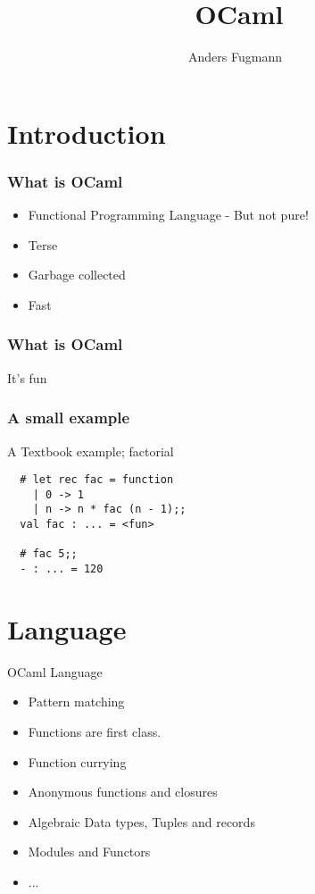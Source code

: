 \documentclass[xcolor=svgnames]{beamer}
\renewcommand{\_}{\mathunderscore}
\begin{document}
\title[Introduction to OCaml]{\
  OCaml
}
\author[Anders Fugmann]{\
  \normalfont Anders Fugmann
}
\date{}

\maketitle

\section{Introduction}

\begin{frame}[fragile]
  \frametitle{What is OCaml}
  \pause
   \begin{itemize}
   \item Functional Programming Language - But not pure!
  \pause
   \item Terse
  \pause
   \item Garbage collected
  \pause
   \item Fast
   \end{itemize}
\end{frame}

\begin{frame}[fragile]
  \frametitle{What is OCaml}
  \begin{center}
    \Huge It's fun
  \end{center}
\end{frame}

\begin{frame}[fragile]
  \frametitle{A small example}
  A Textbook example; factorial
  \begin{lstlisting}
  # let rec fac = function
    | 0 -> 1
    | n -> n * fac (n - 1);;
  val fac : ... = <fun>

  # fac 5;;
  - : ... = 120

  \end{lstlisting}
\end{frame}

\section{Language}
\begin{frame}
  OCaml Language
  \begin{itemize}
  \item Pattern matching
  \item Functions are first class.
  \item Function currying
  \item Anonymous functions and closures
  \item Algebraic Data types, Tuples and records
  \item Modules and Functors
  \item ...
  \end{itemize}
\end{frame}
\end{document}
